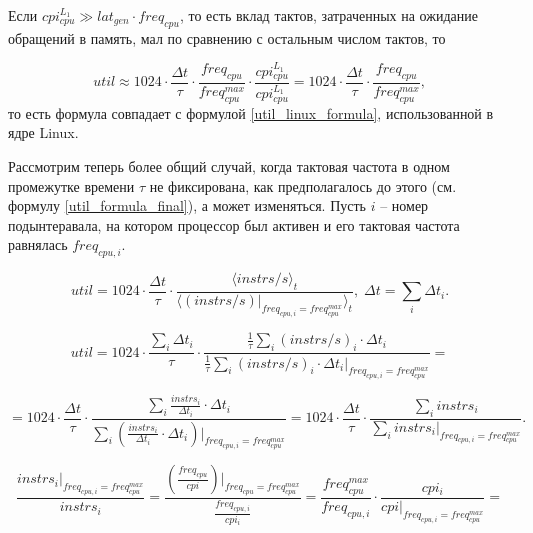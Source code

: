     Если $cpi_{cpu}^{L_1} \gg lat_{gen} \cdot freq_{cpu}$, то есть вклад тактов, затраченных на ожидание
    обращений в память, мал по сравнению с остальным числом тактов, то

    \begin{equation}
        util \approx 1024 \cdot \frac{\Delta t}{\tau} \cdot \frac{freq_{cpu}}{freq_{cpu}^{max}} \cdot
            \frac{cpi_{cpu}^{L_1}} {cpi_{cpu}^{L_1}} = 1024 \cdot \frac{\Delta t}{\tau} \cdot
            \frac{freq_{cpu}}{freq_{cpu}^{max}},
    \end{equation}
    то есть формула совпадает с формулой \eqref{util_linux_formula}, использованной в ядре Linux.

    Рассмотрим теперь более общий случай, когда тактовая частота в одном промежутке времени $\tau$
    не фиксирована, как предполагалось до этого (см. формулу \eqref{util_formula_final}), а может
    изменяться. Пусть $i$ -- номер подынтеравала, на котором процессор был активен и его тактовая
    частота равнялась $freq_{cpu, i}$.

    \begin{equation}
        util = 1024 \cdot \frac{\Delta t}{\tau} \cdot
            \frac{\langle instrs / s \rangle_t }{ \langle (instrs / s) |_{freq_{cpu, i} = freq_{cpu}^{max}} \rangle_t},
            \; \Delta t = \sum \limits_i \Delta t_i.
    \end{equation}

    \begin{equation}
        util = 1024 \cdot \frac{\sum \limits_i \Delta t_i}{\tau} \cdot
            \frac{\frac{1}{\tau} \sum \limits_i (instrs / s)_i \cdot \Delta t_i}
                 {\frac{1}{\tau} \sum \limits_i (instrs / s)_i \cdot \Delta t_i |_{freq_{cpu, i} = freq_{cpu}^{max}}} =
    \end{equation}

    \begin{equation*}
        = 1024 \cdot \frac{\Delta t}{\tau} \cdot
        \frac{\sum \limits_i \frac{instrs_i}{\Delta t_i} \cdot \Delta t_i}
             {\sum \limits_i (\frac{instrs_i}{\Delta t_i} \cdot \Delta t_i) |_{freq_{cpu, i} = freq_{cpu}^{max}}} =
        1024 \cdot \frac{\Delta t}{\tau} \cdot
        \frac{\sum \limits_i instrs_i}
             {\sum \limits_i instrs_i |_{freq_{cpu, i} = freq_{cpu}^{max}}}.
    \end{equation*}

    \begin{equation}
        \frac{instrs_i |_{freq_{cpu, i} = freq_{cpu}^{max}}}{instrs_i} =
            \frac{(\frac{freq_{cpu}}{cpi}) |_{freq_{cpu} = freq_{cpu}^{max}}}{\frac{freq_{cpu, i}}{cpi_i}} =
            \frac{freq_{cpu}^{max}}{freq_{cpu, i}} \cdot \frac{cpi_i}{cpi |_{freq_{cpu, i} = freq_{cpu}^{max}}} =
    \end{equation}

